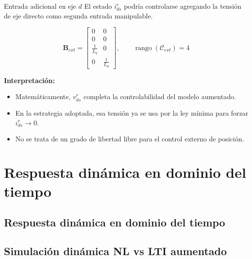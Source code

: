 \documentclass[aspectratio=169,t]{beamer}
\newcommand{\SecPresentacion}{Presentación del problema}
\newcommand{\SecMecanico}{Subsistema mecánico equivalente}
\newcommand{\SecElectromagnetico}{Subsistema electromagnético en coordenadas qd0}
\newcommand{\SecTermico}{Subsistema térmico}
\newcommand{\SecNLGlobal}{Sistema No Lineal Global}
\newcommand{\SecLPV}{Linealización Jacobiana (LPV)}
\newcommand{\SecLTI}{Obtención del modelo LTI equivalente}
\newcommand{\SecAnalisisLTI}{Análisis del modelo LTI aumentado}
\newcommand{\SecDinamica}{Respuesta dinámica en dominio del tiempo}
\newcommand{\SecControlador}{Diseño y análisis del controlador en cascada}
\newcommand{\SecVerifSpecs}{Verificación de desempeño: Especificaciones de operación}
\newcommand{\SecVerifOffset}{Verificación de desempeño: Offset de estado estacionario}
\newcommand{\SecVerifNoIdealidades}{Verificación de desempeño: No idealidades y comportamiento térmico}
\newcommand{\SecDiscretizacion}{Discretización del controlador}
\newcommand{\SecSoftware}{Codificación del software de control}
\newcommand{\AgendaItem}[3]{%
  \ifnum#1=#2
    {\scriptsize\bfseries\color{uncBlue}%
      \hyperlink{sec:#1}{\makebox[2.2em][r]{#1.}\hspace{0.7em}%
      \parbox[t]{0.86\textwidth}{#3}}\par}%
  \else
    {\scriptsize\color{black!26}%
      \hyperlink{sec:#1}{\makebox[2.2em][r]{#1.}\hspace{0.7em}%
      \parbox[t]{0.86\textwidth}{#3}}\par}%
  \fi
  \vspace{0.35mm}%
}
\newcommand{\AgendaBody}[1]{%
    \vspace{3mm}
    {\Large\bfseries\color{uncBlue}Tabla de contenidos\par}
    \vspace{2mm}
    \begin{minipage}{0.94\textwidth}
      \AgendaItem{1}{#1}{\SecPresentacion}
      \AgendaItem{2}{#1}{\SecMecanico}
      \AgendaItem{3}{#1}{\SecElectromagnetico}
      \AgendaItem{4}{#1}{\SecTermico}
      \AgendaItem{5}{#1}\SecNLGlobal
      \AgendaItem{6}{#1}{\SecLPV}
      \AgendaItem{7}{#1}{\SecLTI}
      \AgendaItem{8}{#1}{\SecAnalisisLTI}
      \AgendaItem{9}{#1}{\SecDinamica}
      \AgendaItem{10}{#1}{\SecControlador}
      \AgendaItem{11}{#1}{\SecVerifSpecs}
      \AgendaItem{12}{#1}{\SecVerifOffset}
      \AgendaItem{13}{#1}{\SecVerifNoIdealidades}
      \AgendaItem{14}{#1}{\SecDiscretizacion}
      \AgendaItem{15}{#1}{\SecSoftware}
    \end{minipage}
    \vfill
}
\newcommand{\AgendaSlideTarget}[2]{%
  \begin{frame}[plain]
    \hypertarget{#2}{}%
    \AgendaBody{#1}
  \end{frame}
}
\newcommand{\StartProjectSection}[2]{%
  \section{#2}%
  \subsection{#2}%
  \AgendaSlideTarget{#1}{sec:#1}%
}
\begin{document}
\begin{frame}{Entrada adicional en eje $d$}
{\small\color{uncGray}El estado $i_{ds}^{r}$ podría controlarse agregando la tensión de eje directo como segunda entrada manipulable.}\par
\vspace{2mm}

\begin{equation*}
\bm{B}_{ext}=
\begin{bmatrix}
0 & 0\\
0 & 0\\
\frac{1}{L_q} & 0\\
0 & \frac{1}{L_d}
\end{bmatrix},
\qquad
\operatorname{rango}(\mathcal{C}_{ext})=4
\end{equation*}

\textbf{Interpretación:}
\begin{itemize}
  \item Matemáticamente, $v_{ds}^{r}$ completa la controlabilidad del modelo aumentado.
  \item En la estrategia adoptada, esa tensión ya se usa por la ley mínima para forzar $i_{ds}^{r}\to0$.
  \item No se trata de un grado de libertad libre para el control externo de posición.
\end{itemize}
\end{frame}


\StartProjectSection{9}{\SecDinamica}
\subsection{Simulación dinámica NL vs LTI aumentado}
\end{document}
